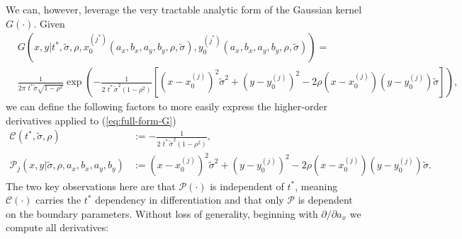 \documentclass[10pt]{article}
\begin{document}
We can, however, leverage the very tractable analytic form of the
Gaussian kernel $G(\cdot)$. Given
\begin{align}
  & G(x,y | t^{*}, \tilde{\sigma}, \rho, x_0^{(j^*)}(a_x, b_x, a_y, b_y, \rho, \tilde{\sigma}),
    y_0^{(j^*)}(a_x, b_x, a_y, b_y, \rho, \tilde{\sigma})) = &  \nonumber \\
  & \frac{1}{2\pi\,\, t^{*}\tilde{\sigma}\sqrt{1-\rho^2}} \exp\left( -\frac{1}{2\,\,t^*\, \tilde{\sigma}^2 (1-\rho^2)} \left[ \left(x-x_0^{(j)}\right)^2 \tilde{\sigma}^2 + \left(y-y_0^{(j)}\right)^2 - 2\rho(x-x_0^{(j)})(y-y_0^{(j)})\tilde{\sigma} \right]\right), & \label{eq:full-form-G}
\end{align}
we can define the following factors to more easily express the
higher-order derivatives applied to (\ref{eq:full-form-G})
\begin{align}
  \mathcal{C}(t^*, \tilde{\sigma}, \rho) &:= -\frac{1}{2\,\,t^*\, \tilde{\sigma}^2 (1-\rho^2)}, \\
  \mathcal{P}_j(x,y | \tilde{\sigma}, \rho, a_x,b_x,a_y,b_y) &:= \left(x-x_0^{(j)}\right)^2 \tilde{\sigma}^2 + \left(y-y_0^{(j)}\right)^2 - 2\rho(x-x_0^{(j)})(y-y_0^{(j)})\tilde{\sigma}.
\end{align}
The two key observations here are that $\mathcal{P}(\cdot)$ is
independent of $t^{*}$, meaning $\mathcal{C}(\cdot)$ carries the
$t^{*}$ dependency in differentiation and that only $\mathcal{P}$ is
dependent on the boundary parameters. Without loss of generality,
beginning with $\partial/\partial a_x$ we compute all derivatives:
\end{document}
